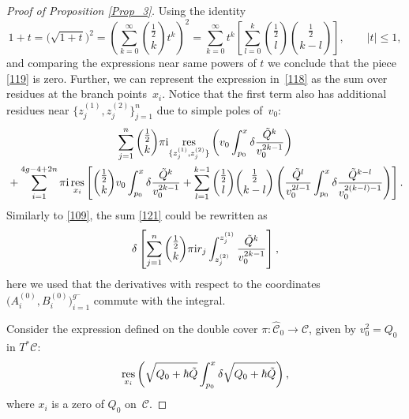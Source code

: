 \documentclass[pdftex]{sigma}
\numberwithin{equation}{section}
\theoremstyle{definition}
\begin{document}
\begin{proof}[Proof of Proposition \ref{Prop_3}]
Using the identity
\begin{equation*}%
1+t=\big(\sqrt{1+t}\big)^2=\left(\sum^{\infty}_{k=0}\binom{\frac{1}{2}}{k}t^k \right)^2=\sum^{\infty}_{k=0}t^k \left[\sum^k_{l=0}\binom{\frac{1}{2}}{l} \binom{\frac{1}{2}}{k-l} \right], \qquad |t| \leq 1, \end{equation*}
and comparing the expressions near same powers of $t$ we conclude that the piece \eqref{119} is zero. Further, we can represent the expression in~\eqref{118} as the sum over residues at the branch points~$x_i$. Notice that the first term also has additional residues near $\big\{z^{(1)}_j, z^{(2)}_j \big\}^n_{j=1}$ due to simple poles of~$v_0$:
\begin{gather}\label{121}
\sum^n_{j=1}\binom{\frac{1}{2}}{k}\pi {\rm i}\underset{\{z^{(1)}_j, z^{(2)}_j \}}{\rm res}\left(v_0
\int^x_{p_0}\delta\frac{\tilde{Q}^k}{v_0^{2k-1}} \right)\\
 \label{122}
 {}+\sum^{4g-4+2n}_{i=1}\pi{\rm i} \, \underset{x_i}{\rm res}\left[\binom{\frac{1}{2}}{k}v_0
\int^x_{p_0}\delta\frac{\tilde{Q}^k}{v_0^{2k-1}}+ \sum^{k-1}_{l=1}\binom{\frac{1}{2}}{l} \binom{\frac{1}{2}}{k-l}\left(\frac{\tilde{Q}^l}{v_0^{2l-1}}
\int^x_{p_0}\delta \frac{\tilde{Q}^{k-l}}{v_0^{2(k-l)-1}}\right)\right].
\end{gather}
Similarly to \eqref{109}, the sum \eqref{121} could be rewritten as
\begin{equation}\label{123}\delta\left[\sum^n_{j=1}\binom{\frac{1}{2}}{k}
\pi {\rm i} r_j \int^{z^{(1)}_j}_{z^{(2)}_j}\frac{\tilde{Q}^k}{v_0^{2k-1}} \right],\end{equation}
here we used that the derivatives with respect to the coordinates $\big(A^{(0)}_i, B^{(0)}_i\big)^{g^-}_{i=1}$ commute with the integral.

Consider the expression defined on the double cover $\pi\colon \hat{\mathcal{C}}_0 \xrightarrow[]{} \mathcal{C}$, given by $v^2_0=Q_0$ in $T^*\mathcal{C}$:
\begin{equation*}%
\underset{x_i}{\rm res}\left(\sqrt{Q_0+\hbar \tilde{Q}}\int^x_{p_0} \delta \sqrt{Q_0+\hbar \tilde{Q}}\right),
\end{equation*} where $x_i$ is a zero of $Q_0$ on~$\mathcal{C}$.


\end{proof}
\end{document}
